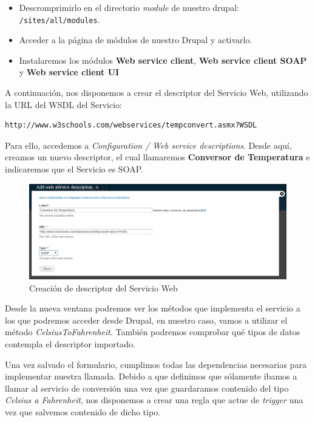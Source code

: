 \begin{itemize}
  \item Descromprimirlo en el directorio \textit{module} de nuestro drupal: \verb|/sites/all/modules|.
  \item Acceder a la página de módulos de nuestro Drupal y activarlo.
  \item Instalaremos los módulos \textbf{Web service client}, \textbf{Web service client SOAP} y \textbf{Web service client UI}
\end{itemize}

A continuación, nos disponemos a crear el descriptor del Servicio Web, utilizando la URL del WSDL del Servicio:

\begin{verbatim}
http://www.w3schools.com/webservices/tempconvert.asmx?WSDL
\end{verbatim}

Para ello, accedemos a \textit{Configuration / Web service descriptions}.
Desde aquí, creamos un nuevo descriptor, el cual llamaremos \textbf{Conversor de Temperatura} e indicaremos que el Servicio es SOAP.

\begin{figure}
  \centering
    \includegraphics[width=1\textwidth]{Assets/Soap/Imagenes/crear_descriptor_servicio.png}
  \caption{Creación de descriptor del Servicio Web}
\end{figure}

Desde la nueva ventana podremos ver los métodos que implementa el servicio a los que podremos acceder desde Drupal, 
en nuestro caso, vamos a utilizar el método \textit{CelsiusToFahrenheit}. También podremos comprobar qué tipos de 
datos contempla el descriptor importado. 

Una vez salvado el formulario, cumplimos todas las dependencias necesarias para implementar nuestra llamada. 
Debido a que definimos que sólamente ibamos a llamar al servicio de conversión una vez que guardaramos contenido del tipo 
\textit{Celsius a Fahrenheit}, nos disponemos a crear una regla que actue de \textit{trigger} una vez que salvemos contenido 
de dicho tipo.


